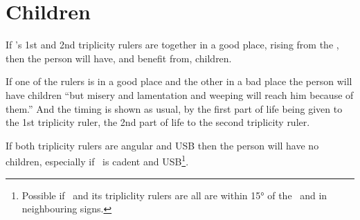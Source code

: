\section{Children}
If \Jupiter's 1st and 2nd triplicity rulers are together in a good place, rising from the \Sun, then the person will have, and benefit from, children.

If one of the rulers is in a good place and the other in a bad place the person will have children ``but misery and lamentation and weeping will reach him because of them.'' And the timing is shown as usual, by the first part of life being given to the 1st triplicity ruler, the 2nd part of life to the second triplicity ruler.

If both triplicity rulers are angular and USB then the person will have no children, especially if \Jupiter\, is cadent and USB\footnote{Possible if \Jupiter\, and its tripliclity rulers are all are within 15° of the \Sun\, and in neighbouring signs.}.